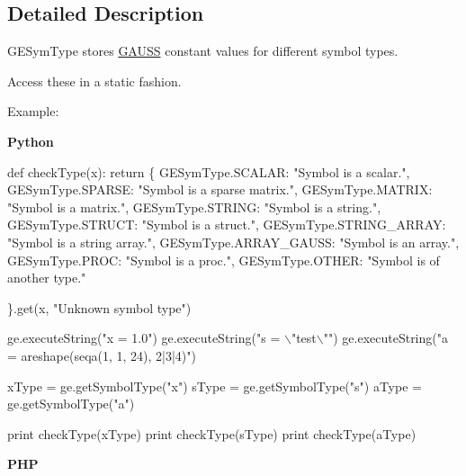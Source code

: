 \subsection{Detailed Description}
G\+E\+Sym\+Type stores \hyperlink{class_g_a_u_s_s}{G\+A\+U\+SS} constant values for different symbol types. 

Access these in a static fashion.

Example\+:

{\bfseries Python} 
\begin{DoxyCode}
\textcolor{keyword}{def }checkType(x):
    \textcolor{keywordflow}{return} \{
        GESymType.SCALAR:
            \textcolor{stringliteral}{"Symbol is a scalar."},
        GESymType.SPARSE:
            \textcolor{stringliteral}{"Symbol is a sparse matrix."},
        GESymType.MATRIX:
            \textcolor{stringliteral}{"Symbol is a matrix."},
        GESymType.STRING:
            \textcolor{stringliteral}{"Symbol is a string."},
        GESymType.STRUCT:
            \textcolor{stringliteral}{"Symbol is a struct."},
        GESymType.STRING\_ARRAY:
            \textcolor{stringliteral}{"Symbol is a string array."},
        GESymType.ARRAY\_GAUSS:
            \textcolor{stringliteral}{"Symbol is an array."},
        GESymType.PROC:
            \textcolor{stringliteral}{"Symbol is a proc."},
        GESymType.OTHER:
            \textcolor{stringliteral}{"Symbol is of another type."}

        \}.get(x, \textcolor{stringliteral}{"Unknown symbol type"})

ge.executeString(\textcolor{stringliteral}{"x = 1.0"})
ge.executeString(\textcolor{stringliteral}{"s = \(\backslash\)"test\(\backslash\)""})
ge.executeString(\textcolor{stringliteral}{"a = areshape(seqa(1, 1, 24), 2|3|4)"})

xType = ge.getSymbolType(\textcolor{stringliteral}{"x"})
sType = ge.getSymbolType(\textcolor{stringliteral}{"s"})
aType = ge.getSymbolType(\textcolor{stringliteral}{"a"})

\textcolor{keywordflow}{print} checkType(xType)
\textcolor{keywordflow}{print} checkType(sType)
\textcolor{keywordflow}{print} checkType(aType)
\end{DoxyCode}
 {\bfseries P\+HP} 
